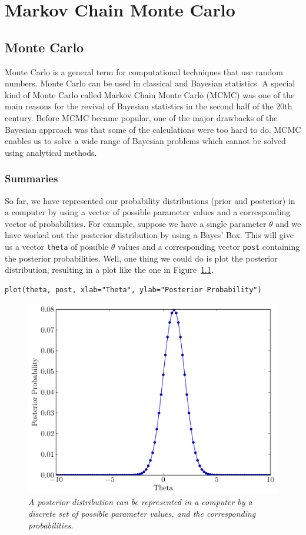 \chapter{Markov Chain Monte Carlo}
\section{Monte Carlo}
Monte Carlo is a general term for computational techniques that use random
numbers.
Monte Carlo can be used in classical and Bayesian statistics. A special kind
of Monte Carlo
called Markov Chain Monte Carlo (MCMC) was one of the main reasons
for the revival of Bayesian statistics in the second half of the 20th century.
Before MCMC became popular, one of the major drawbacks of the Bayesian approach
was that some of the calculations were too hard to do. MCMC enables us to solve
a wide range of Bayesian problems which cannot be solved using analytical
methods.

\subsection{Summaries}
So far, we have represented our probability distributions (prior and posterior)
in a computer by using a vector of possible parameter values and a corresponding
vector of probabilities. For example, suppose we have a single parameter $\theta$
and we have worked out the posterior distribution by using a Bayes' Box. This
will give us a vector {\tt theta} of possible $\theta$ values and a corresponding
vector {\tt post} containing the posterior probabilities. Well, one thing we could
do is plot the posterior distribution, resulting in a plot like the one in
Figure~\ref{fig:normal}.
\begin{verbatim}
plot(theta, post, xlab="Theta", ylab="Posterior Probability")
\end{verbatim}

\begin{figure}[!ht]
\begin{center}
\includegraphics[scale=0.5]{Figures/normal.pdf}
\caption{\it A posterior distribution can be represented in a computer by a discrete
set of possible parameter values, and the corresponding probabilities.\label{fig:normal}}
\end{center}
\end{figure}

